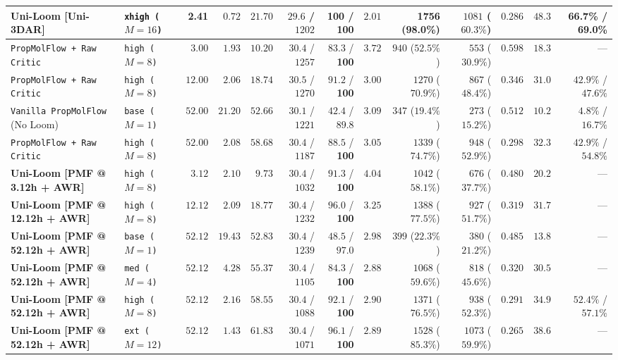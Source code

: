 \documentclass[11pt,a4paper]{article}
\begin{document}
\begin{table}[t]
{\begin{tabular}{@{}llrrrrrrrrrrr@{}}
\textbf{Uni-Loom [Uni-3DAR]} & \texttt{xhigh ($M=16$)} & \textbf{2.41} & $0.72$ & $21.70$ & $29.6$ / $1202$ & \textbf{100} / \textbf{100} & $2.01$ & \textbf{1756} (\textbf{98.0\%}) & $1081$ ($60.3\%$) & $0.286$ & $48.3$ & \textbf{66.7\%} / \textbf{69.0\%} \\
\midrule
\texttt{PropMolFlow + Raw Critic} & \texttt{high ($M=8$)} & $3.00$ & $1.93$ & $10.20$ & $30.4$ / $1257$ & $83.3$ / \textbf{100} & $3.72$ & $940$ ($52.5\%$) & $553$ ($30.9\%$) & $0.598$ & $18.3$ & --- \\
\texttt{PropMolFlow + Raw Critic} & \texttt{high ($M=8$)} & $12.00$ & $2.06$ & $18.74$ & $30.5$ / $1270$ & $91.2$ / \textbf{100} & $3.00$ & $1270$ ($70.9\%$) & $867$ ($48.4\%$) & $0.346$ & $31.0$ & $42.9\%$ / $47.6\%$ \\
\texttt{Vanilla PropMolFlow} (No Loom) & \texttt{base ($M=1$)} & $52.00$ & $21.20$ & $52.66$ & $30.1$ / $1221$ & $42.4$ / $89.8$ & $3.09$ & $347$ ($19.4\%$) & $273$ ($15.2\%$) & $0.512$ & $10.2$ & $4.8\%$ / $16.7\%$ \\
\texttt{PropMolFlow + Raw Critic} & \texttt{high ($M=8$)} & $52.00$ & $2.08$ & $58.68$ & $30.4$ / $1187$ & $88.5$ / \textbf{100} & $3.05$ & $1339$ ($74.7\%$) & $948$ ($52.9\%$) & $0.298$ & $32.3$ & $42.9\%$ / $54.8\%$ \\
\midrule
\textbf{Uni-Loom [PMF @ 3.12h + AWR]} & \texttt{high ($M=8$)} & $3.12$ & $2.10$ & $9.73$ & $30.4$ / $1032$ & $91.3$ / \textbf{100} & $4.04$ & $1042$ ($58.1\%$) & $676$ ($37.7\%$) & $0.480$ & $20.2$ & --- \\
\textbf{Uni-Loom [PMF @ 12.12h + AWR]} & \texttt{high ($M=8$)} & $12.12$ & $2.09$ & $18.77$ & $30.4$ / $1232$ & $96.0$ / \textbf{100} & $3.25$ & $1388$ ($77.5\%$) & $927$ ($51.7\%$) & $0.319$ & $31.7$ & --- \\
\textbf{Uni-Loom [PMF @ 52.12h + AWR]} & \texttt{base ($M=1$)} & $52.12$ & $19.43$ & $52.83$ & $30.4$ / $1239$ & $48.5$ / $97.0$ & $2.98$ & $399$ ($22.3\%$) & $380$ ($21.2\%$) & $0.485$ & $13.8$ & --- \\
\textbf{Uni-Loom [PMF @ 52.12h + AWR]} & \texttt{med ($M=4$)} & $52.12$ & $4.28$ & $55.37$ & $30.4$ / $1105$ & $84.3$ / \textbf{100} & $2.88$ & $1068$ ($59.6\%$) & $818$ ($45.6\%$) & $0.320$ & $30.5$ & --- \\
\textbf{Uni-Loom [PMF @ 52.12h + AWR]} & \texttt{high ($M=8$)} & $52.12$ & $2.16$ & $58.55$ & $30.4$ / $1088$ & $92.1$ / \textbf{100} & $2.90$ & $1371$ ($76.5\%$) & $938$ ($52.3\%$) & $0.291$ & $34.9$ & $52.4\%$ / $57.1\%$ \\
\textbf{Uni-Loom [PMF @ 52.12h + AWR]} & \texttt{ext ($M=12$)} & $52.12$ & $1.43$ & $61.83$ & $30.4$ / $1071$ & $96.1$ / \textbf{100} & $2.89$ & $1528$ ($85.3\%$) & $1073$ ($59.9\%$) & $0.265$ & $38.6$ & --- \\

\end{tabular}}
\end{table}
\end{document}

